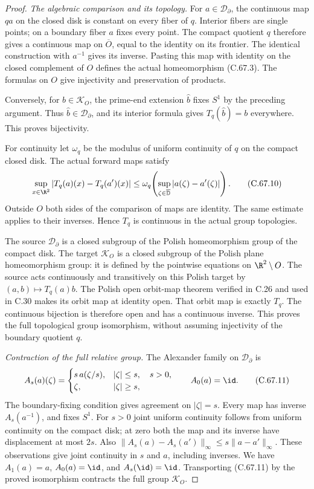 \begin{proof}
\emph{The algebraic comparison and its topology.}
For $a\in\mathcal D_\partial$, the
continuous map $qa$ on the closed
disk is constant on every fiber
of $q$. Interior fibers are single
points; on a boundary fiber $a$
fixes every point. The compact
quotient $q$ therefore gives a
continuous map on $\overline O$,
equal to the identity on its
frontier. The identical construction
with $a^{-1}$ gives its inverse.
Pasting this map with identity on
the closed complement of $O$
defines the actual homeomorphism
(C.67.3). The formulas on $O$
give injectivity and preservation
of products.

Conversely, for $b\in\mathcal K_O$,
the prime-end extension $\widehat b$
fixes $S^1$ by the preceding argument.
Thus $\widehat b\in\mathcal D_\partial$,
and its interior formula gives
$T_q(\widehat b)=b$ everywhere.
This proves bijectivity.

For continuity let $\omega_q$ be
the modulus of uniform continuity
of $q$ on the compact closed disk.
The actual forward maps satisfy
\[
 \sup_{x\in\R^2}|T_q(a)(x)-T_q(a')(x)|
       \leq
       \omega_q\!\left(
        \sup_{\zeta\in\overline{\mathbb D}}
                                      |a(\zeta)-a'(\zeta)|
                    \right).                           \tag{C.67.10}
\]
Outside $O$ both sides of the
comparison of maps are identity.
The same estimate applies to
their inverses. Hence $T_q$
is continuous in the actual
group topologies.

The source $\mathcal D_\partial$
is a closed subgroup of the
Polish homeomorphism group of
the compact disk. The target
$\mathcal K_O$ is a closed
subgroup of the Polish plane
homeomorphism group: it is
defined by the pointwise
equations on $\R^2\setminus O$.
The source acts continuously
and transitively on this Polish
target by $(a,b)\mapsto T_q(a)b$.
The Polish open orbit-map
theorem verified in C.26 and
used in C.30 makes its orbit
map at identity open.
That orbit map is exactly
$T_q$. The continuous bijection
is therefore open and has a
continuous inverse. This proves
the full topological group
isomorphism, without assuming
injectivity of the boundary
quotient $q$.

\emph{Contraction of the full relative group.}
The Alexander family on
$\mathcal D_\partial$ is
\[
 A_s(a)(\zeta)=
 \begin{cases}
       s\,a(\zeta/s),&|\zeta|\leq s,\quad s>0,\\
       \zeta,&|\zeta|\geq s ,
 \end{cases}
 \qquad A_0(a)=\id.                                    \tag{C.67.11}
\]
The boundary-fixing condition
gives agreement on $|\zeta|=s$.
Every map has inverse
$A_s(a^{-1})$, and fixes $S^1$.
For $s>0$ joint uniform
continuity follows from uniform
continuity on the compact disk;
at zero both the map and its
inverse have displacement at
most $2s$. Also
$\|A_s(a)-A_s(a')\|_\infty
\leq s\|a-a'\|_\infty$.
These observations give joint
continuity in $s$ and $a$,
including inverses.
We have $A_1(a)=a$,
$A_0(a)=\id$, and
$A_s(\id)=\id$.
Transporting (C.67.11) by the
proved isomorphism contracts
the full group $\mathcal K_O$.


\end{proof}
